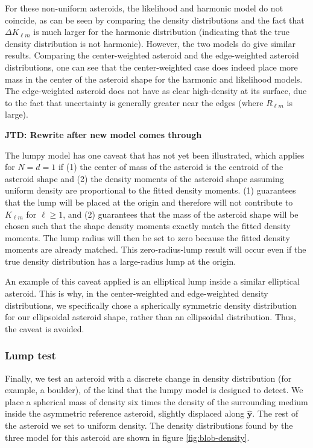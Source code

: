 \documentclass[fleqn,usenatbib]{mnras}
\newcommand{\jtd}[1]{ {\bf{\color{red} JTD: #1}} }
\newcommand{\unit}[1]{\bm{\hat{#1}}}
\begin{document}
For these non-uniform asteroids, the likelihood and harmonic model do not coincide, as can be seen by comparing the density distributions and the fact that $\Delta K_{\ell m}$ is much larger for the harmonic distribution (indicating that the true density distribution is not harmonic). However, the two models do give similar results. Comparing the center-weighted asteroid and the edge-weighted asteroid distributions, one can see that the center-weighted case does indeed place more mass in the center of the asteroid shape for the harmonic and likelihood models. The edge-weighted asteroid does not have as clear high-density at its surface, due to the fact that uncertainty is generally greater near the edges (where $R_{\ell m}$ is large).

\jtd{Rewrite after new model comes through}

The lumpy model has one caveat that has not yet been illustrated, which applies for $N=d=1$ if (1) the center of mass of the asteroid is the centroid of the asteroid shape and (2) the density moments of the asteroid shape assuming uniform density are proportional to the fitted density moments. (1) guarantees that the lump will be placed at the origin and therefore will not contribute to $K_{\ell m}$ for $\ell \geq 1$, and (2) guarantees that the mass of the asteroid shape will be chosen such that the shape density moments exactly match the fitted density moments. The lump radius will then be set to zero because the fitted density moments are already matched. This zero-radius-lump result will occur even if the true density distribution has a large-radius lump at the origin.

An example of this caveat applied is an elliptical lump inside a similar elliptical asteroid. This is why, in the center-weighted and edge-weighted density distributions, we specifically chose a spherically symmetric density distribution for our ellipsoidal asteroid shape, rather than an ellipsoidal distribution. Thus, the caveat is avoided.



\subsubsection{Lump test}

Finally, we test an asteroid with a discrete change in density distribution (for example, a boulder), of the kind that the lumpy model is designed to detect. We place a spherical mass of density six times the density of the surrounding medium inside the asymmetric reference asteroid, slightly displaced along $\unit y$. The rest of the asteroid we set to uniform density. The density distributions found by the three model for this asteroid are shown in figure \ref{fig:blob-density}.
\end{document}
